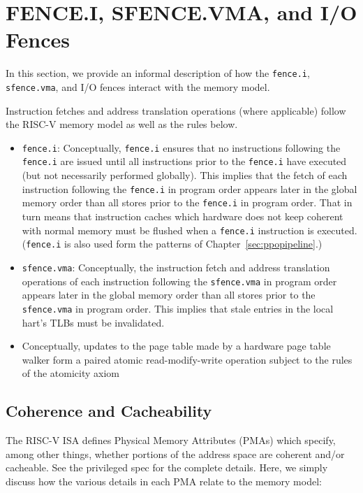 \section{FENCE.I, SFENCE.VMA, and I/O Fences}

In this section, we provide an informal description of how the {\tt fence.i}, {\tt sfence.vma}, and I/O fences interact with the memory model.

Instruction fetches and address translation operations (where applicable) follow the RISC-V memory model as well as the rules below.
\begin{itemize}
  \item {\tt fence.i}: Conceptually, {\tt fence.i} ensures that no instructions following the {\tt fence.i} are issued until all instructions prior to the {\tt fence.i} have executed (but not necessarily performed globally).
    This implies that the fetch of each instruction following the {\tt fence.i} in program order appears later in the global memory order than all stores prior to the {\tt fence.i} in program order.
    That in turn means that instruction caches which hardware does not keep coherent with normal memory must be flushed when a {\tt fence.i} instruction is executed.
    ({\tt fence.i} is also used form the patterns of Chapter~\ref{sec:ppopipeline}.)
  \item {\tt sfence.vma}: Conceptually, the instruction fetch and address translation operations of each instruction following the {\tt sfence.vma} in program order appears later in the global memory order than all stores prior to the {\tt sfence.vma} in program order.
    This implies that stale entries in the local hart's TLBs must be invalidated.
  \item Conceptually, updates to the page table made by a hardware page table walker form a paired atomic read-modify-write operation subject to the rules of the atomicity axiom
\end{itemize}

\subsection{Coherence and Cacheability}

The RISC-V ISA defines Physical Memory Attributes (PMAs) which specify, among other things, whether portions of the address space are coherent and/or cacheable.
See the privileged spec for the complete details.
Here, we simply discuss how the various details in each PMA relate to the memory model:

